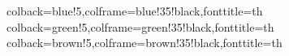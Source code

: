 \usepackage{tcolorbox}

%
{colback=blue!5,colframe=blue!35!black,fonttitle=\bfseries}{th}
%
{colback=green!5,colframe=green!35!black,fonttitle=\bfseries}{th}
%
{colback=brown!5,colframe=brown!35!black,fonttitle=\bfseries}{th}
\usepackage{tikz}
\usepackage{pgfplots}
%
%
%
%
%
%
%
%
%
